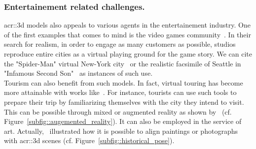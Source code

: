         \subsubsection{Entertainement related challenges.}
            \gls{acr::3d} models also appeals to various agents in the entertainement industry.
            One of the first examples that comes to mind is the video games community~\parencite{watson2008procedural}.
            In their search for realism, in order to engage as many customers as possible, studios reproduce entire cities as a virtual playing ground for the game story.
            We can cite the "Spider-Man" virtual New-York city~\parencite{gilbert2018i,plante2013how} or the realistic facsimile of Seattle in "Infamous Second Son"~\parencite{mcwhertor2013under} as instances of such use.\\
            Tourism can also benefit from such models.
            In fact, virtual touring has become more attainable with works like~\parencite{koutsoudis20073d}.
            For instance, tourists can use such tools to prepare their trip by familiarizing themselves with the city they intend to visit.
            This can be possible through mixed or augmented reality as shown by~\textcite{devaux20183d} (cf. Figure~\ref{subfig::augemented_reality}).
            It can also be employed in the service of art.
            Actually,~\textcite{russell2011automatic,aubry2014painting} illustrated how it is possible to align paintings or photographs with \gls{acr::3d} scenes (cf. Figure~\ref{subfig::historical_pose}).\\
